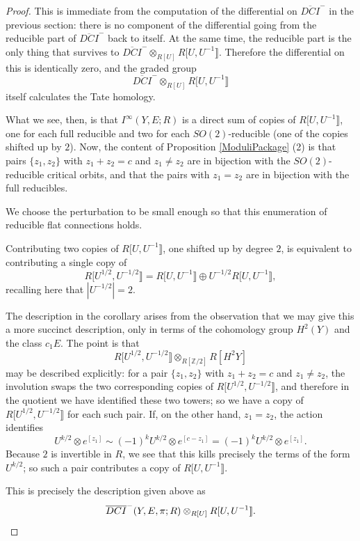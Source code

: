 \documentclass{memo-l}
\theoremstyle{definition}
\theoremstyle{remark}
\numberwithin{section}{chapter}
\numberwithin{equation}{chapter}
\begin{document}
\begin{proof}This is immediate from the computation of the differential on $\overline{DCI}^-$ in the previous section: there is no component of the differential going from the reducible part of $\overline{DCI}^-$ back to itself. At the same time, the reducible part is the only thing that survives to $\overline{DCI}^- \otimes_{R[U]} R[U, U^{-1}\rrbracket.$ Therefore the differential on this is identically zero, and the graded group $$\overline{DCI}^- \otimes_{R[U]} R[U, U^{-1}\rrbracket$$ itself calculates the Tate homology.

What we see, then, is that $I^\infty(Y,E;R)$ is a direct sum of copies of $R[U, U^{-1}\rrbracket$, one for each full reducible and two for each $SO(2)$-reducible (one of the copies shifted up by $2$). Now, the content of Proposition \ref{ModuliPackage} (2) is that pairs $\{z_1, z_2\}$ with $z_1 + z_2 = c$ and $z_1 \neq z_2$ are in bijection with the $SO(2)$-reducible critical orbits, and that the pairs with $z_1 = z_2$ are in bijection with the full reducibles.

We choose the perturbation to be small enough so that this enumeration of reducible flat connections holds.

Contributing two copies of $R[U, U^{-1}\rrbracket$, one shifted up by degree $2$, is equivalent to contributing a single copy of 
$$R[U^{1/2}, U^{-1/2}\rrbracket =R[U, U^{-1}\rrbracket \oplus U^{-1/2} R[U, U^{-1}\rrbracket,$$ 
recalling here that $|U^{-1/2}| = 2$.

The description in the corollary arises from the observation that we may give this a more succinct description, only in terms of the cohomology group $H^2(Y)$ and the class $c_1 E$. The point is that $$R[U^{1/2}, U^{-1/2}\rrbracket \otimes_{R[\mathbb Z/2]} R[H^2 Y]$$ may be described explicitly: for a pair $\{z_1, z_2\}$ with $z_1 + z_2 = c$ and $z_1 \neq z_2$, the involution swaps the two corresponding copies of $R[U^{1/2}, U^{-1/2}\rrbracket$, and therefore in the quotient we have identified these two towers; so we have a copy of $R[U^{1/2}, U^{-1/2}\rrbracket$ for each such pair. If, on the other hand, $z_1 = z_2$, the action identifies 
$$U^{k/2} \otimes e^{[z_1]} \sim (-1)^k U^{k/2} \otimes e^{[c - z_1]} = (-1)^k U^{k/2} \otimes e^{[z_1]}.$$ 
Because $2$ is invertible in $R$, we see that this kills precisely the terms of the form $U^{k/2}$; so such a pair contributes a copy of $R[U, U^{-1}\rrbracket.$

This is precisely the description given above as $$\overline{DCI}^-(Y,E,\pi;R) \otimes_{R[U]} R[U, U^{-1}\rrbracket.\qedhere$$
\end{proof}
\end{document}
